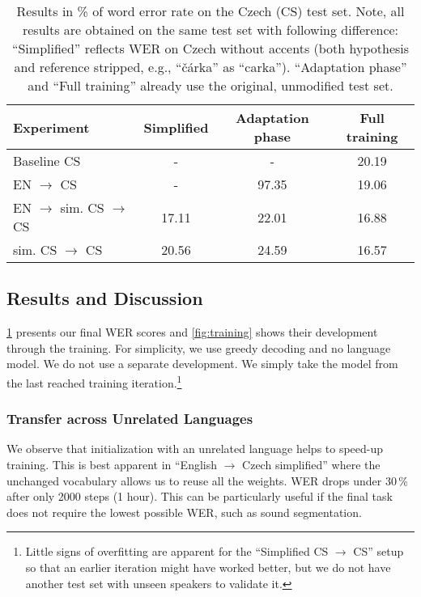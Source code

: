 \begin{table}[t]
	\small\centering
	\begin{tabular}{lc|cc}
		\bf Experiment & \bf Simplified & \bf Adaptation phase & \bf Full training \\
		\hline
		Baseline CS & - &  - &  20.19 \\
		EN $\rightarrow$ CS & -  & 97.35 &  19.06  \\
		EN $\rightarrow$ sim. CS $\rightarrow$ CS & 17.11  & 22.01 &  16.88 \\
		sim. CS $\rightarrow$ CS & 20.56  &  24.59 &  16.57  \\
	\end{tabular}
	\caption{Results in \% of word error rate on the Czech (CS) test set. Note, all results are obtained on the same test set with following difference: ``Simplified'' reflects WER on Czech without accents (both hypothesis and reference stripped, e.g., ``\v{c}\'arka'' as ``carka''). ``Adaptation phase'' and ``Full training'' already use the original, unmodified test set.}
	\label{tab:results}
\end{table}



\subsection{Results and Discussion}
\label{sec:results}


\cref{tab:results} presents our final WER scores and \cref{fig:training} shows their development through the training. For simplicity, we use greedy decoding and no language model. We do not use a separate development. We simply take the model from the last reached training iteration.\footnote{Little signs of overfitting are apparent for the ``Simplified CS $\rightarrow$ CS'' setup so that an earlier iteration might have worked better, but we do not have another test set with unseen speakers to validate it.}

\subsubsection{Transfer across Unrelated Languages}

We observe that initialization %
with an unrelated language helps to speed-up training. This is best apparent in ``English $\rightarrow$ Czech simplified'' where the unchanged vocabulary allows us to reuse all the weights. WER drops under 30\,\%  after only 2000 steps (1 hour). This can be particularly useful if the final task does not require the lowest possible WER, such as sound segmentation.



